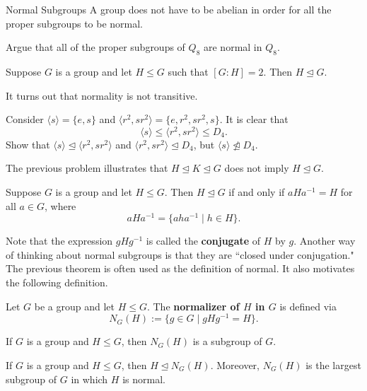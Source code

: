 \begin{section}{Normal Subgroups}
A group does not have to be abelian in order for all the proper subgroups to be normal.

\begin{problem}
Argue that all of the proper subgroups of $Q_8$ are normal in $Q_8$. 
\end{problem}

\begin{theorem}\label{thm:index2}
Suppose $G$ is a group and let $H\leq G$ such that $[G:H]=2$.  Then $H\trianglelefteq G$.
\end{theorem}

It turns out that normality is not transitive.

\begin{problem}
Consider $\langle s\rangle=\{e,s\}$ and $\langle r^2,sr^2\rangle =\{e,r^2,sr^2,s\}$. It is clear that
\[
\langle s\rangle\leq \langle r^2,sr^2\rangle\leq D_4.
\]
Show that $\langle s\rangle\trianglelefteq \langle r^2,sr^2\rangle$ and $\langle r^2,sr^2\rangle\trianglelefteq D_4$, but $\langle s\rangle\not\trianglelefteq D_4$.
\end{problem}

The previous problem illustrates that $H\trianglelefteq K \trianglelefteq G$ does not imply $H\trianglelefteq G$.

\begin{theorem}
Suppose $G$ is a group and let $H\leq G$.  Then $H\trianglelefteq G$ if and only if $aHa^{-1}=H$ for all $a\in G$, where
\[
aHa^{-1}=\{aha^{-1}\mid h\in H\}.
\]
\end{theorem}

Note that the expression $gHg^{-1}$ is called the \textbf{conjugate} of $H$ by $g$.  Another way of thinking about normal subgroups is that they are ``closed under conjugation." The previous theorem is often used as the definition of normal.  It also motivates the following definition.

\begin{definition}
Let $G$ be a group and let $H\leq G$.  The \textbf{normalizer of $H$ in $G$} is defined via
\[
N_G(H):=\{g\in G\mid gHg^{-1}=H\}.
\]
\end{definition}

\begin{theorem}
If $G$ is a group and $H\leq G$, then $N_G(H)$ is a subgroup of $G$.
\end{theorem}

\begin{theorem}
If $G$ is a group and $H\leq G$, then $H\trianglelefteq N_G(H)$.  Moreover, $N_G(H)$ is the largest subgroup of $G$ in which $H$ is normal. 
\end{theorem}


\end{section}
